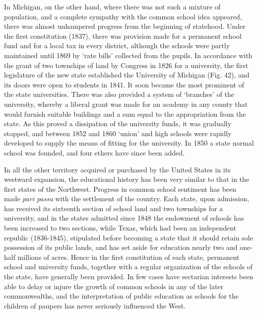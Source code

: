 \documentclass[]{book}
\begin{document}
In Michigan, on the other hand, where there was not such a mixture of population, and a complete sympathy with the common school idea appeared, there was almost unhampered progress from the beginning of statehood. Under the first constitution (1837), there was provision made for a permanent school fund and for a local tax in every district, although the schools were partly maintained until 1869 by `rate bills' collected from the pupils. In accordance with the grant of two townships of land by Congress in 1826 for a university, the first legislature of the new state established the University of Michigan (Fig. 42), and its doors were open to students in 1841. It soon became the most prominent of the state universities. There was also provided a system of `branches' of the university, whereby a liberal grant was made for an academy in any county that would furnish suitable buildings and a sum equal to the appropriation from the state. As this proved a dissipation of the university funds, it was gradually stopped, and between 1852 and 1860 `union' and high schools were rapidly developed to supply the means of fitting for the university. In 1850 a state normal school was founded, and four ethers have since been added.

In all the other territory acquired or purchased by the United States in its westward expansion, the educational history has been very similar to that in the first states of the Northwest. Progress in common school sentiment has been made \emph{pari passu} with the settlement of the country. Each state, upon admission, has received its sixteenth section of school land and two townships for a university, and in the states admitted since 1848 the endowment of schools has been increased to two sections, while Texas, which had been an independent republic (1836-1845), stipulated before becoming a state that it should retain sole possession of its public lands, and has set aside for education nearly two and one-half millions of acres. Hence in the first constitution of each state, permanent school and university funds, together with a regular organization of the schools of the state, have generally been provided. In few cases have sectarian interests been able to delay or injure the growth of common schools in any of the later commonwealths, and the interpretation of public education as schools for the children of paupers has never seriously influenced the West.
\end{document}
